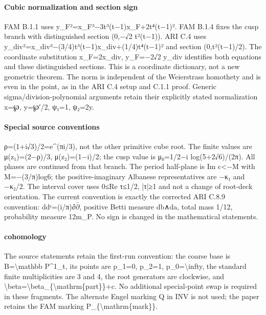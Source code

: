 \documentclass[11pt,a4paper]{article}
\theoremstyle{plain}
\theoremstyle{definition}
\begin{document}
\paragraph{Cubic normalization and section sign}
FAM B.1.1 uses y\_\allowbreak{}F²=x\_\allowbreak{}F³−3t³(t−1)x\_\allowbreak{}F+2t⁴(t−1)². FAM B.1.4 fixes the cusp branch with distinguished section (0,−√2 t²(t−1)). ARI C.4 uses y\_\allowbreak{}div²=x\_\allowbreak{}div³−(3/\allowbreak{}4)t³(t−1)x\_\allowbreak{}div+(1/\allowbreak{}4)t⁴(t−1)² and section (0,t²(t−1)/\allowbreak{}2). The coordinate substitution x\_\allowbreak{}F=2x\_\allowbreak{}div, y\_\allowbreak{}F=−2√2 y\_\allowbreak{}div identifies both equations and these distinguished sections. This is a coordinate dictionary, not a new geometric theorem. The norm is independent of the Weierstrass homothety and is even in the point, as in the ARI C.4 setup and C.1.1 proof. Generic sigma/\allowbreak{}division-polynomial arguments retain their explicitly stated normalization x=℘, y=℘′/\allowbreak{}2, ψ₁=1, ψ₂=2y.
\paragraph{Special source conventions}
ρ=(1+i√3)/\allowbreak{}2=e\textasciicircum{}(πi/\allowbreak{}3), not the other primitive cube root. The finite values are μ(z₁)=(2−ρ)/\allowbreak{}3, μ(z₂)=(1−i)/\allowbreak{}2; the cusp value is μ₀=1/\allowbreak{}2−i log(5+2√6)/\allowbreak{}(2π). All phases are continued from that branch. The period half-plane is Im c<−M with M=−(3/\allowbreak{}π)log6; the positive-imaginary Albanese representatives are −κ₁ and −κ₂/\allowbreak{}2. The interval cover uses 0≤Re τ≤1/\allowbreak{}2, |τ|≥1 and not a change of root-deck orientation.
The current convention is exactly the corrected ARI C.8.9 convention:\allowbreak{} ddᶜ=(i/\allowbreak{}π)∂\ensuremath{\bar\partial}, positive Betti measure db∧da, total mass 1/\allowbreak{}12, probability measure 12m\_\allowbreak{}P. No sign is changed in the mathematical statements.
\paragraph{cohomology}
The source statements retain the first-run convention:\allowbreak{} the coarse base is B=\textbackslash{}mathbb P\textasciicircum{}1\_\allowbreak{}t, its points are p\_\allowbreak{}1=0, p\_\allowbreak{}2=1, p\_\allowbreak{}0=\textbackslash{}infty, the standard finite multiplicities are 3 and 4, the root generators are clockwise, and \textbackslash{}beta=\textbackslash{}beta\_\allowbreak{}\{\textbackslash{}mathrm\{part\}\}+c. No additional special-point swap is required in these fragments. The alternate Engel marking Q in INV is not used; the paper retains the FAM marking P\_\allowbreak{}\{\textbackslash{}mathrm\{mark\}\}.
\end{document}
